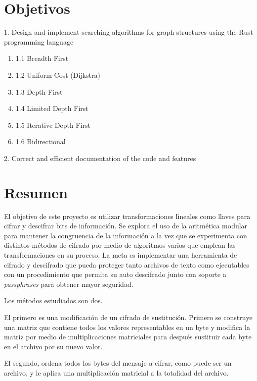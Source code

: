 \vfill

\newpage
\tableofcontents

\newpage
\section{Objetivos}

1. Design and implement searching algorithms for graph structures using
the Rust programming language

\begin{enumerate}[label={}]
\item 1.1 Breadth First
\item 1.2 Uniform Cost (Dijkstra)
\item 1.3 Depth First
\item 1.4 Limited Depth First
\item 1.5 Iterative Depth First
\item 1.6 Bidirectional
\end{enumerate}



2. Correct and efficient documentation of the code and features


\section{Resumen}

El objetivo de este proyecto es utilizar transformaciones lineales como llaves
para cifrar y descifrar bits de información.
Se explora el uso de la aritmética modular para mantener la congruencia de la
información
 a la vez que se experimenta con distintos métodos de cifrado por medio de
algoritmos varios que emplean las transformaciones en su proceso.
La meta es implementar una herramienta de cifrado y descifrado que pueda
proteger tanto archivos de texto como ejecutables con un procedimiento
que permita su auto descifrado junto con soporte a \textit{passphrases} para
obtener mayor seguridad.

Los métodos estudiados son dos. 

El primero es una modificación de un cifrado de sustitución. Primero se
construye una matriz que contiene todos los valores representables en un 
byte y modifica la matriz por medio de multiplicaciones matriciales para
después sustituir cada byte en el archivo por su nuevo valor. 

El segundo, ordena todos los bytes del mensaje a cifrar, como puede ser un
archivo, y le aplica una multiplicación matricial a la totalidad del archivo. 

